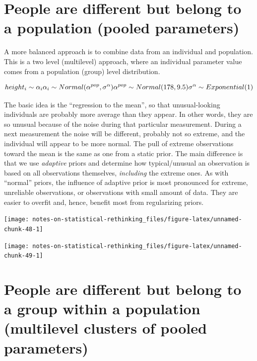 \documentclass[
]{book}
\begin{document}
\hypertarget{people-are-different-but-belong-to-a-population-pooled-parameters}{%
\section{People are different but belong to a population (pooled parameters)}\label{people-are-different-but-belong-to-a-population-pooled-parameters}}

A more balanced approach is to combine data from an individual and population. This is a two level (multilevel) approach, where an individual parameter value comes from a population (group) level distribution.

\[height_i \sim \alpha_i\\
\alpha_i \sim Normal(\alpha^{pop}, \sigma^{\alpha})\\
\alpha^{pop} \sim Normal(178, 9.5)\\
\sigma^{\alpha} \sim Exponential(1)\]

The basic idea is the ``regression to the mean'', so that unusual-looking individuals are probably more average than they appear. In other words, they are so unusual because of the noise during that particular measurement. During a next measurement the noise will be different, probably not so extreme, and the individual will appear to be more normal. The pull of extreme observations toward the mean is the same as one from a static prior. The main difference is that we use \emph{adaptive} priors and determine how typical/unusual an observation is based on all observations themselves, \emph{including} the extreme ones. As with ``normal'' priors, the influence of adaptive prior is most pronounced for extreme, unreliable observations, or observations with small amount of data. They are easier to overfit and, hence, benefit most from regularizing priors.

\begin{center}\texttt{[image: notes-on-statistical-rethinking\_files/figure-latex/unnamed-chunk-48-1]} \end{center}

\begin{center}\texttt{[image: notes-on-statistical-rethinking\_files/figure-latex/unnamed-chunk-49-1]} \end{center}

\hypertarget{people-are-different-but-belong-to-a-group-within-a-population-multilevel-clusters-of-pooled-parameters}{%
\section{People are different but belong to a group within a population (multilevel clusters of pooled parameters)}\label{people-are-different-but-belong-to-a-group-within-a-population-multilevel-clusters-of-pooled-parameters}}
\end{document}
